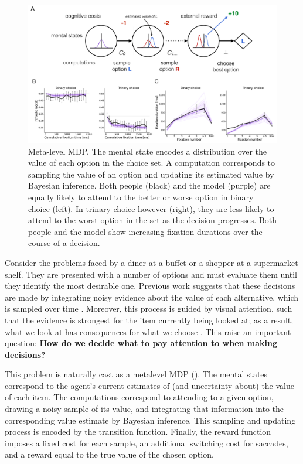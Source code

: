 \documentclass[dsingle]{memo}
\begin{document}
\begin{figure}[t!]
  \centering
  \includegraphics[width=\textwidth]{diagrams/precis/attention.pdf}
  \caption{
     Meta-level MDP. The mental state encodes a distribution over the value of each option in the choice set. A computation corresponds to sampling the value of an option and updating its estimated value by Bayesian inference.
     Both people (black) and the model (purple) are equally likely to attend to the better or worse option in binary choice (left). In trinary choice however (right), they are less likely to attend to the worst option in the set as the decision progresses.
     Both people and the model show increasing fixation durations over the course of a decision.
  }
  \label{fig:attention}
\end{figure}


Consider the problems faced by a diner at a buffet or a shopper at a supermarket shelf. They are presented with a number of options and must evaluate them until they identify the most desirable one. Previous work suggests that these decisions are made by integrating noisy evidence about the value of each alternative, which is sampled over time \citep{ratcliff2008diffusion,milosavljevic2010drift,usher2001time}. Moreover, this process is guided by visual attention, such that the evidence is strongest for the item currently being looked at; as a result, what we look at has consequences for what we choose \citep{shimojo2003gaze,armel2008biasing,krajbich2010visual}. This raise an important question: \textbf{How do we decide what to pay attention to when making decisions?}

This problem is naturally cast as a metalevel MDP (). The mental states correspond to the agent's current estimates of (and uncertainty about) the value of each item. The computations correspond to attending to a given option, drawing a noisy sample of its value, and integrating that information into the corresponding value estimate by Bayesian inference. This sampling and updating process is encoded by the transition function. Finally, the reward function imposes a fixed cost for each sample, an additional switching cost for saccades, and a reward equal to the true value of the chosen option.
\end{document}
